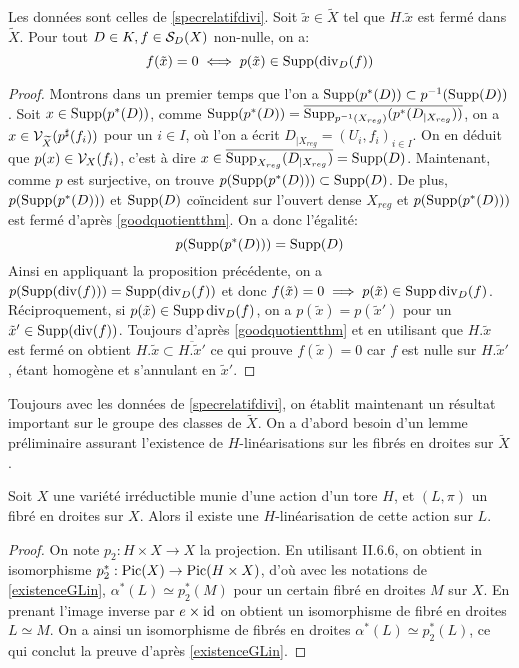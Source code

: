 \begin{cor}\label{zerosspecrelatif}
Les données sont celles de \ref{specrelatifdivi}. Soit $\tilde{x}\in\widetilde{X}$ tel que $H.\tilde{x}$ est fermé dans $\widetilde{X}$. Pour tout $D\in K, f\in \mathcal{S}_D(X)$ non-nulle, on a:
$$f(\tilde{x})=0 \iff p(\tilde{x})\in \operatorname{Supp}(\operatorname{div}_D(f))$$
\end{cor}
\begin{proof}
Montrons dans un premier temps que l'on a $\operatorname{Supp}(p^*(D))\subset p^{-1}(\operatorname{Supp}(D))$. Soit $x\in \operatorname{Supp} (p^*(D))$, comme $\operatorname{Supp}(p^*(D))=\overline{\operatorname{Supp}_{p^{-1}(X_{reg})}(p^*(D_{|X_{reg}}))}$, on a $x\in\mathcal{V}_{\widetilde{X}}(p^\sharp(f_i))$ pour un $i\in I$, où l'on a écrit $D_{|X_{reg}}=(U_i, f_i)_{i\in I}$. On en déduit que $p(x)\in \mathcal{V}_X(f_i)$, c'est à dire $x\in \overline{\operatorname{Supp}_{X_{reg}}(D_{|X_{reg}})}=\operatorname{Supp}(D)$. Maintenant, comme $p$ est surjective, on trouve $p(\operatorname{Supp}(p^*(D)))\subset \operatorname{Supp}(D)$. De plus, $p(\operatorname{Supp}(p^*(D)))$ et $\operatorname{Supp}(D)$ coïncident sur l'ouvert dense $X_{reg}$ et $p(\operatorname{Supp}(p^*(D)))$ est fermé d'après \ref{goodquotientthm}. On a donc l'égalité:$$p(\operatorname{Supp}(p^*(D)))=\operatorname{Supp}(D)$$
Ainsi en appliquant la proposition précédente, on a $p(\operatorname{Supp}(\operatorname{div}(f)))= \operatorname{Supp}(\operatorname{div}_D(f))$ et donc $f(\tilde{x})=0 \implies p(\tilde{x})\in\operatorname{Supp} \operatorname{div}_D(f)$. Réciproquement, si $p(\tilde{x})\in\operatorname{Supp} \operatorname{div}_D(f)$, on a $p(\tilde{x})=p(\tilde{x}')$ pour un $\tilde{x}'\in \operatorname{Supp}(\operatorname{div}(f))$. Toujours d'après \ref{goodquotientthm} et en utilisant que $H.\tilde{x}$ est fermé on obtient $H.\tilde{x}\subset\overline{H.\tilde{x}'}$ ce qui prouve $f(\tilde{x})=0$ car $f$ est nulle sur $H.\tilde{x}'$, étant homogène et s'annulant en $\tilde{x}'$.
\end{proof}

Toujours avec les données de \ref{specrelatifdivi}, on établit maintenant un résultat important sur le groupe des classes de $\widetilde{X}$. On a d'abord besoin d'un lemme préliminaire assurant l'existence de $H$-linéarisations sur les fibrés en droites sur $\widetilde{X}$.

\begin{lem}\label{existenceGLinTore}
Soit $X$ une variété irréductible munie d'une action d'un tore $H$, et $(L,\pi)$ un fibré en droites sur $X$. Alors il existe une $H$-linéarisation de cette action sur $L$.
\end{lem}
\begin{proof}
On note $p_2:H\times X\rightarrow X$ la projection. En utilisant \cite{Hartshorne} II.6.6, on obtient in isomorphisme $p_2^*:\operatorname{Pic}(X)\rightarrow \operatorname{Pic}(H\times X)$, d'où avec les notations de \ref{existenceGLin}, $\alpha^*(L)\simeq p_2^*(M)$ pour un certain fibré en droites $M$ sur $X$. En prenant l'image inverse par $e\times \operatorname{id}$ on obtient un isomorphisme de fibré en droites $L\simeq M$. On a ainsi un isomorphisme de fibrés en droites $\alpha^*(L)\simeq p_2^*(L)$, ce qui conclut la preuve d'après \ref{existenceGLin}.
\end{proof}

